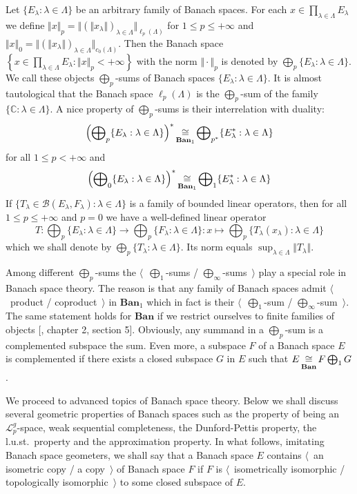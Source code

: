 Let $ \{E_\lambda:\lambda\in\Lambda \}$ be an arbitrary family of Banach spaces.
For each $x\in \prod_{\lambda\in\Lambda} E_\lambda$ we define 
$\Vert x\Vert_p
=\Vert{
  (\Vert x_\lambda\Vert)}_{\lambda\in\Lambda}
\Vert_{\ell_p(\Lambda)}$
for $1\leq p\leq +\infty$ and 
$\Vert x\Vert_0
=\Vert
  {(\Vert x_\lambda\Vert)}_{\lambda\in\Lambda}
\Vert_{c_0(\Lambda)}$. 
Then the Banach space
$\left \{
  x\in \prod_{\lambda\in\Lambda} E_\lambda
  :\Vert x\Vert_p<+\infty
\right \}$ 
with the norm $\Vert\cdot\Vert_p$ is denoted by $\bigoplus_p
\{E_\lambda:\lambda\in\Lambda \}$. We call these objects $\bigoplus_p$-sums of
Banach spaces $ \{E_\lambda:\lambda\in\Lambda \}$. It is almost tautological
that the Banach space $\ell_p(\Lambda)$ is the $\bigoplus_p$-sum of the family $
\{\mathbb{C}:\lambda\in\Lambda \}$. A nice property of $\bigoplus_p$-sums is
their interrelation with duality:
$$
{\left(\bigoplus\nolimits_p \{E_\lambda:\lambda\in\Lambda \}\right)}^*
\mathop{\mathbin{\cong}}\limits_{\mathbf{Ban}_1}
\bigoplus\nolimits_{p^*} \{E_\lambda^*:\lambda\in\Lambda \}
$$
for all $1\leq p<+\infty$ and 
$$
{\left(\bigoplus\nolimits_0 \{E_\lambda:\lambda\in\Lambda \}\right)}^*
\mathop{\mathbin{\cong}}\limits_{\mathbf{Ban}_1}
\bigoplus\nolimits_1 \{E_\lambda^*:\lambda\in\Lambda \}
$$
If $ \{T_\lambda\in\mathcal{B}(E_\lambda, F_\lambda):\lambda\in\Lambda \}$ is a
family of bounded linear operators, then for all $1\leq p\leq+\infty$ and $p=0$
we have a well-defined linear operator
$$
T:\bigoplus\nolimits_p \{E_\lambda:\lambda\in\Lambda \}
  \to 
\bigoplus\nolimits_p \{ F_\lambda:\lambda\in\Lambda \}
:x\mapsto \bigoplus\nolimits_p \{ T_\lambda(x_\lambda):\lambda\in\Lambda \}
$$
which we shall denote by $\bigoplus_p \{T_\lambda:\lambda\in\Lambda \}$. Its
norm equals $\sup_{\lambda\in\Lambda}\Vert T_\lambda\Vert$.

Among different $\bigoplus_p$-sums the $\langle$~$\bigoplus_1$-sums /
$\bigoplus_\infty$-sums~$\rangle$ play a special role in Banach space theory.
The reason is that any family of Banach spaces admit $\langle$~product /
coproduct~$\rangle$ in $\mathbf{Ban}_1$ which in fact is their
$\langle$~$\bigoplus_1$-sum / $\bigoplus_\infty$-sum~$\rangle$. The same
statement holds for $\mathbf{Ban}$ if we restrict ourselves to finite families
of objects [\cite{HelLectAndExOnFuncAn}, chapter 2, section 5]. Obviously, any 
summand in a $\bigoplus_p$-sum is a complemented subspace the sum. Even more, a
subspace $F$ of a Banach space $E$ is complemented if there exists a closed
subspace $G$ in $E$ such that $E\mathop{\mathbin{\cong}}\limits_{\mathbf{Ban}}F\bigoplus_1 G$.

We proceed to advanced topics of Banach space theory. Below we shall discuss
several geometric properties of Banach spaces such as the property of being an
$\mathscr{L}_p^g$-space, weak sequential completeness, the Dunford-Pettis
property, the l.u.st.\ property and the approximation property. In what follows,
imitating Banach space geometers, we shall say that a Banach space $E$ contains
$\langle$~an isometric copy / a copy~$\rangle$ of Banach space $F$ if $F$ is
$\langle$~isometrically isomorphic / topologically isomorphic~$\rangle$ to some
closed subspace of $E$. 

